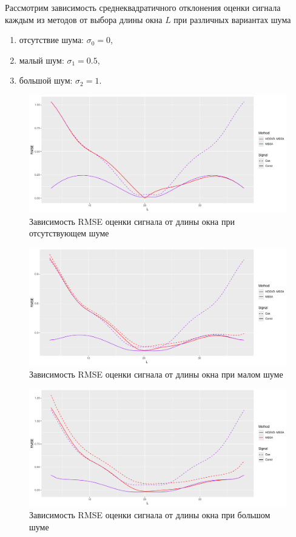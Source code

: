 \documentclass[specialist,
    substylefile = spbu.rtx,
    subf,href,colorlinks=true, 12pt]{disser}
\theoremstyle{plain}
\theoremstyle{definition}
\theoremstyle{remark}
\begin{document}
    Рассмотрим зависимость среднеквадратичного отклонения оценки сигнала каждым из методов от выбора длины окна
    $L$ при различных вариантах шума
    \begin{enumerate}
        \item отсутствие шума: $\sigma_0 = 0$,
        \item малый шум: $\sigma_1 = 0.5$,
        \item большой шум: $\sigma_2 = 1$.
    \end{enumerate}


    \begin{figure}[!h]
        \centering
        \includegraphics[width=0.87\linewidth]{approx_sep_no_noise}
        \caption{Зависимость RMSE оценки сигнала от длины окна при отсутствующем шуме}
        \label{fig:approx-sep-no-noise}
    \end{figure}
    \begin{figure}[!h]
        \centering
        \includegraphics[width=0.87\linewidth]{approx_sep_small_noise}
        \caption{Зависимость RMSE оценки сигнала от длины окна при малом шуме}
        \label{fig:approx-sep-small-noise}
    \end{figure}
    \begin{figure}[!h]
        \centering
        \includegraphics[width=0.87\linewidth]{approx_sep_large_noise}
        \caption{Зависимость RMSE оценки сигнала от длины окна при большом шуме}
        \label{fig:approx-sep-large-noise}
    \end{figure}
\end{document}

